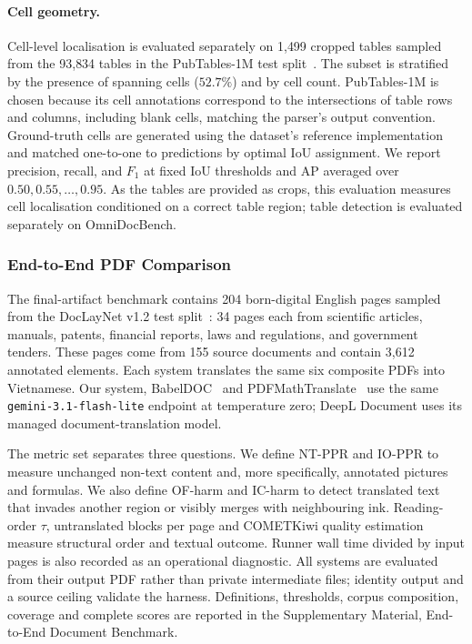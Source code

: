 \paragraph{Cell geometry.}
Cell-level localisation is evaluated separately on 1{,}499 cropped tables sampled
from the 93{,}834 tables in the PubTables-1M test split~\citep{pubtables1m}.
The subset is stratified by the presence of spanning cells ($52.7\%$) and by
cell count. PubTables-1M is chosen because its cell annotations correspond to
the intersections of table rows and columns, including blank cells, matching
the parser's output convention. Ground-truth cells are generated using the
dataset's reference implementation and matched one-to-one to predictions by
optimal IoU assignment. We report precision, recall, and $F_1$ at fixed IoU
thresholds and AP averaged over $0.50,0.55,\dots,0.95$. As the tables are
provided as crops, this evaluation measures cell localisation conditioned on a
correct table region; table detection is evaluated separately on OmniDocBench.

\subsubsection{End-to-End PDF Comparison}
\label{subsubsec:eval-e2e}

The final-artifact benchmark contains 204 born-digital English pages sampled
from the DocLayNet v1.2 test split~\citep{doclaynet}: 34 pages each from scientific articles,
manuals, patents, financial reports, laws and regulations, and government
tenders. These pages come from 155 source documents and contain 3{,}612
annotated elements. Each system translates the same six composite PDFs into
Vietnamese. Our system, BabelDOC~\citep{babeldoc} and
PDFMathTranslate~\citep{pdf2zh} use the same
\texttt{gemini-3.1-flash-lite} endpoint at temperature zero; DeepL Document uses
its managed document-translation model.

The metric set separates three questions. We define NT-PPR and IO-PPR to measure
unchanged non-text content and, more specifically, annotated pictures and
formulas. We also define OF-harm and IC-harm to detect translated text that
invades another region or visibly merges with neighbouring ink. Reading-order
$\tau$, untranslated blocks per page and COMETKiwi quality estimation measure
structural order and textual outcome. Runner wall time divided by input pages is
also recorded as an operational diagnostic. All systems are evaluated from
their output PDF rather than private intermediate files; identity output and a
source ceiling validate the harness. Definitions, thresholds, corpus
composition, coverage and complete scores are reported in
the Supplementary Material, End-to-End Document Benchmark.

